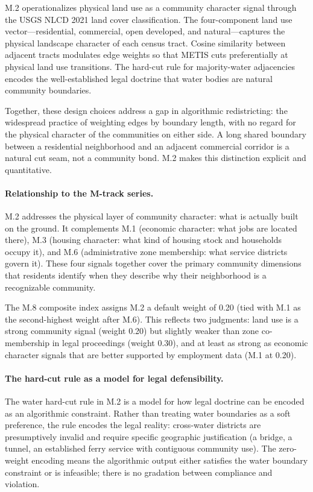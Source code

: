 \label{sec:conclusion}

M.2 operationalizes physical land use as a community character signal through
the USGS NLCD 2021 land cover classification.
The four-component land use vector---residential, commercial, open developed,
and natural---captures the physical landscape character of each census tract.
Cosine similarity between adjacent tracts modulates edge weights so that
METIS cuts preferentially at physical land use transitions.
The hard-cut rule for majority-water adjacencies encodes the well-established
legal doctrine that water bodies are natural community boundaries.

Together, these design choices address a gap in algorithmic redistricting:
the widespread practice of weighting edges by boundary length, with no
regard for the physical character of the communities on either side.
A long shared boundary between a residential neighborhood and an adjacent
commercial corridor is a natural cut seam, not a community bond.
M.2 makes this distinction explicit and quantitative.

\paragraph{Relationship to the M-track series.}
M.2 addresses the physical layer of community character: what is actually
built on the ground.
It complements M.1 (economic character: what jobs are located there),
M.3 (housing character: what kind of housing stock and households occupy
it), and M.6 (administrative zone membership: what service districts
govern it).
These four signals together cover the primary community dimensions that
residents identify when they describe why their neighborhood is a
recognizable community.

The M.8 composite index \citep{m8composite} assigns M.2 a default weight
of 0.20 (tied with M.1 as the second-highest weight after M.6).
This reflects two judgments: land use is a strong community signal
(weight 0.20) but slightly weaker than zone co-membership in legal
proceedings (weight 0.30), and at least as strong as economic character
signals that are better supported by employment data (M.1 at 0.20).

\paragraph{The hard-cut rule as a model for legal defensibility.}
The water hard-cut rule in M.2 is a model for how legal doctrine can be
encoded as an algorithmic constraint.
Rather than treating water boundaries as a soft preference, the rule
encodes the legal reality: cross-water districts are presumptively invalid
and require specific geographic justification (a bridge, a tunnel, an
established ferry service with contiguous community use).
The zero-weight encoding means the algorithmic output either satisfies
the water boundary constraint or is infeasible; there is no gradation
between compliance and violation.

